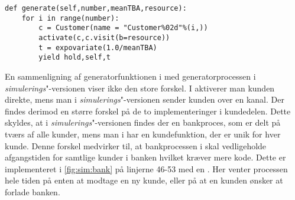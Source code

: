 \begin{lstlisting}[firstnumber=11, label=fig:simpy:generator, caption=Generator funktion for \simpy]
def generate(self,number,meanTBA,resource):         
    for i in range(number):
        c = Customer(name = "Customer%02d"%(i,))
        activate(c,c.visit(b=resource))              
        t = expovariate(1.0/meanTBA)               
        yield hold,self,t
\end{lstlisting}

En sammenligning af generatorfunktionen i \simpy med generatorprocessen i \emph{simulerings}"-versionen viser ikke den store forskel. I \simpy aktiverer man kunden direkte, mens man i \emph{simulerings}"-versionen sender kunden over en kanal. Der findes derimod en større forskel på de to implementeringer i kundedelen. Dette skyldes, at i \emph{simulerings}"-versionen findes der en bankproces, som er delt på tværs af alle kunder, mens man i \simpy har en kundefunktion, der er unik for hver kunde. Denne forskel medvirker til, at bankprocessen i \simpy skal vedligeholde afgangstiden for samtlige kunder i banken  hvilket kræver mere kode. Dette er implementeret i  \cref{fig:sim:bank} på linjerne 46-53 med en . Her venter processen hele tiden på enten at modtage en ny kunde, eller på at en kunden ønsker at forlade banken.

